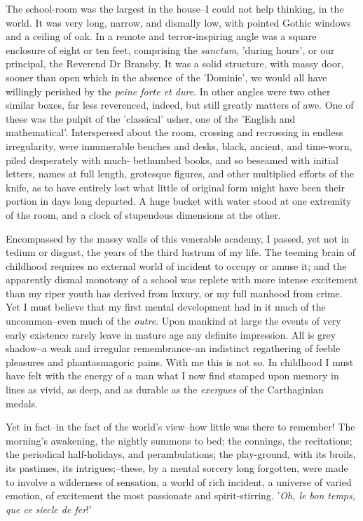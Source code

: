 \documentclass[12pt]{article}
\begin{document}
     The school-room was the largest in the house--I could not help
thinking, in the world.  It was very long, narrow, and dismally
low, with pointed Gothic windows and a ceiling of oak.  In a remote
and terror-inspiring angle was a square enclosure of eight or ten
feet, comprising the \emph{sanctum}, 'during hours', or our principal,
the Reverend Dr Bransby.  It was a solid structure, with massy
door, sooner than open which in the absence of the 'Dominie', we
would all have willingly perished by the \emph{peine forte et dure}. 
In other angles were two other similar boxes, far less reverenced,
indeed, but still greatly matters of awe.  One of these was the
pulpit of the 'classical' usher, one of the 'English and
mathematical'.  Interspersed about the room, crossing and
recrossing in endless irregularity, were innumerable benches and
desks, black, ancient, and time-worn, piled desperately with much-
bethumbed books, and so beseamed with initial letters, names at
full length, grotesque figures, and other multiplied efforts of the
knife, as to have entirely lost what little of original form might
have been their portion in days long departed.  A huge bucket with
water stood at one extremity of the room, and a clock of stupendous
dimensions at the other.

     Encompassed by the massy walls of this venerable academy, I
passed, yet not in tedium or disgust, the years of the third
lustrum of my life.  The teeming brain of childhood requires no
external world of incident to occupy or amuse it; and the
apparently dismal monotony of a school was replete with more
intense excitement than my riper youth has derived from luxury, or
my full manhood from crime.  Yet I must believe that my first
mental development had in it much of the uncommon--even much of the
\emph{outre}.  Upon mankind at large the events of very early
existence rarely leave in mature age any definite impression. 
All is grey shadow--a weak and irregular remembrance--an indistinct
regathering of feeble pleasures and phantasmagoric pains.  With me
this is not so.  In childhood I must have felt with the energy of
a man what I now find stamped upon memory in lines as vivid, as
deep, and as durable as the \emph{exergues} of the Carthaginian
medals.

     Yet in fact--in the fact of the world's view--how little was
there to remember!  The morning's awakening, the nightly summons to
bed; the connings, the recitations; the periodical half-holidays,
and perambulations; the play-ground, with its broils, its pastimes,
its intrigues;--these, by a mental sorcery long forgotten, were
made to involve a wilderness of sensation, a world of rich
incident, a universe of varied emotion, of excitement the most
passionate and spirit-stirring.  '\emph{Oh, le bon temps, que ce
siecle de fer}!'
\end{document}

